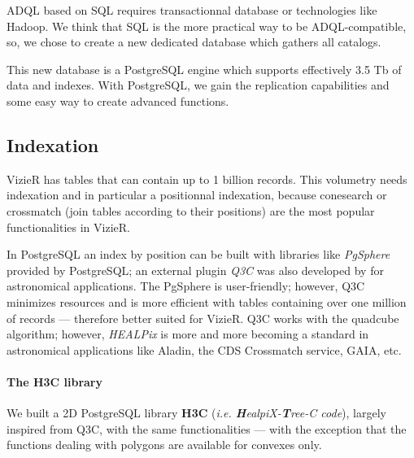 \documentclass[11pt]{article}
\begin{document}
ADQL based on SQL requires %
transactionnal database or %
technologies like Hadoop. We think that SQL is the more practical way
to be ADQL-compatible, so, we chose to create a new dedicated database which
gathers all catalogs. 

This new database is a PostgreSQL engine which supports effectively 3.5 Tb
of data and indexes.
With PostgreSQL, we gain the replication capabilities and some easy way
to create advanced functions.

\subsection{Indexation}
VizieR has tables that can contain up to 1 billion records. This volumetry
needs indexation and in particular a positionnal indexation, because conesearch
or crossmatch (join tables according to their positions) are the most popular 
functionalities in VizieR.

In PostgreSQL an index by position can be built with libraries like {\em PgSphere}
provided by PostgreSQL; an external plugin {\em Q3C}
was also developed 
by \citet{q3c_2006} for astronomical applications.
The PgSphere is user-friendly; however, Q3C minimizes resources and
is more efficient with tables containing over one million of records --- %
therefore better suited for VizieR.
Q3C works with the quadcube algorithm; %
however, {\em HEALPix} is more and more becoming a standard in
astronomical applications like 
Aladin, the CDS Crossmatch service, GAIA, etc.


\paragraph{The H3C library}

We built a 2D PostgreSQL library \textbf{H3C} 
(\textit{i.e. \textbf{H}ealpiX-\textbf{T}ree-C code}), largely inspired from
 Q3C, with the same functionalities --- with the exception that
the functions dealing with polygons are available 
for convexes only.
\end{document}
